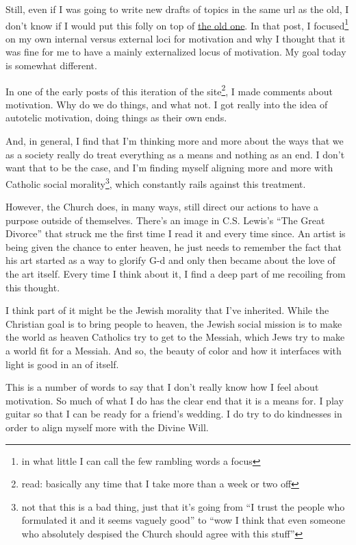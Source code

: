 \documentclass[12pt]{article}
\newcommand{\say}[1]{``#1''}
\renewcommand{\,}{\textsuperscript{,}}
\begin{document}
Still, even if I was going to write new drafts of topics in the same url as the old, I don't know if I would put this folly on top of \href{motivation.html}{the old one}.  
In that post, I focused\footnote{in what little I can call the few rambling words a focus} on my own internal versus external loci for motivation and why I thought that it was fine for me to have a mainly externalized locus of motivation.  
My goal today is somewhat different.

In one of the early posts of this iteration of the site\footnote{read: basically any time that I take more than a week or two off}, I made comments about motivation.  
Why do we do things, and what not.  
I got really into the idea of autotelic motivation, doing things as their own ends.

And, in general, I find that I'm thinking more and more about the ways that we as a society really do treat everything as a means and nothing as an end.  
I don't want that to be the case, and I'm finding myself aligning more and more with Catholic social morality\footnote{not that this is a bad thing, just that it's going from \say{I trust the people who formulated it and it seems vaguely good} to \say{wow I think that even someone who absolutely despised the Church should agree with this stuff}}, which constantly rails against this treatment.

However, the Church does, in many ways, still direct our actions to have a purpose outside of themselves.  
There's an image in C.S. Lewis's \say{The Great Divorce} that struck me the first time I read it and every time since.  
An artist is being given the chance to enter heaven, he just needs to remember the fact that his art started as a way to glorify G-d and only then became about the love of the art itself.  
Every time I think about it, I find a deep part of me recoiling from this thought.

I think part of it might be the Jewish morality that I've inherited.  
While the Christian goal is to bring people to heaven, the Jewish social mission is to make the world as heaven  
Catholics try to get to the Messiah, which Jews try to make a world fit for a Messiah.  
And so, the beauty of color and how it interfaces with light is good in an of itself.

This is a number of words to say that I don't really know how I feel about motivation.  
So much of what I do has the clear end that it is a means for.  
I play guitar so that I can be ready for a friend's wedding.  
I do try to do kindnesses in order to align myself more with the Divine Will.
\end{document}
